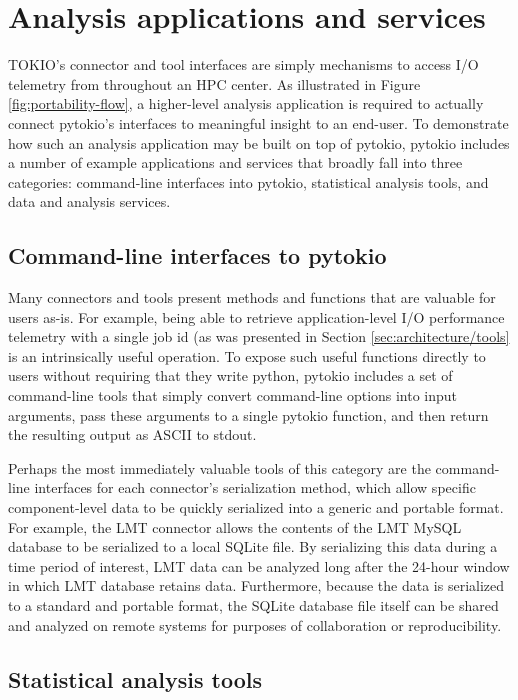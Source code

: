 \section{Analysis applications and services} \label{sec:apps}

TOKIO's connector and tool interfaces are simply mechanisms to access I/O telemetry from throughout an HPC center.
As illustrated in Figure \ref{fig:portability-flow}, a higher-level analysis application is required to actually connect pytokio's interfaces to meaningful insight to an end-user.
To demonstrate how such an analysis application may be built on top of pytokio, pytokio includes a number of example applications and services that broadly fall into three categories: command-line interfaces into pytokio, statistical analysis tools, and data and analysis services.

\subsection{Command-line interfaces to pytokio} \label{sec:apps/cli}

Many connectors and tools present methods and functions that are valuable for users as-is.
For example, being able to retrieve application-level I/O performance telemetry with a single job id (as was presented in Section \ref{sec:architecture/tools} is an intrinsically useful operation.
To expose such useful functions directly to users without requiring that they write python, pytokio includes a set of command-line tools that simply convert command-line options into input arguments, pass these arguments to a single pytokio function, and then return the resulting output as ASCII to stdout.

Perhaps the most immediately valuable tools of this category are the command-line interfaces for each connector's serialization method, which allow specific component-level data to be quickly serialized into a generic and portable format.
For example, the LMT connector allows the contents of the LMT MySQL database to be serialized to a local SQLite file.
By serializing this data during a time period of interest, LMT data can be analyzed long after the 24-hour window in which LMT database retains data.
Furthermore, because the data is serialized to a standard and portable format, the SQLite database file itself can be shared and analyzed on remote systems for purposes of collaboration or reproducibility.

\subsection{Statistical analysis tools} \label{sec:apps/analysis}

